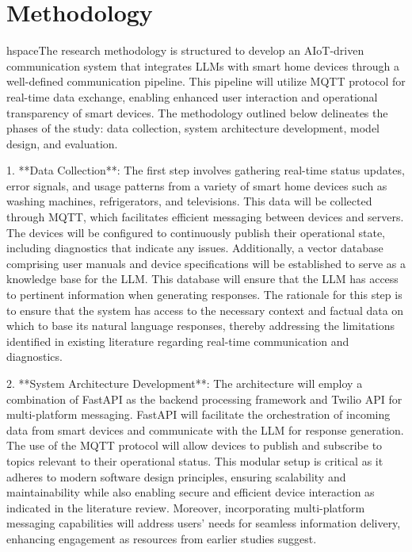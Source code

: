 \documentclass[conference]{IEEEtran}
\begin{document}
\section{Methodology}
hspace{}The research methodology is structured to develop an AIoT-driven communication system that integrates LLMs with smart home devices through a well-defined communication pipeline. This pipeline will utilize MQTT protocol for real-time data exchange, enabling enhanced user interaction and operational transparency of smart devices. The methodology outlined below delineates the phases of the study: data collection, system architecture development, model design, and evaluation.

1. **Data Collection**: 
   The first step involves gathering real-time status updates, error signals, and usage patterns from a variety of smart home devices such as washing machines, refrigerators, and televisions. This data will be collected through MQTT, which facilitates efficient messaging between devices and servers. The devices will be configured to continuously publish their operational state, including diagnostics that indicate any issues. Additionally, a vector database comprising user manuals and device specifications will be established to serve as a knowledge base for the LLM. This database will ensure that the LLM has access to pertinent information when generating responses. The rationale for this step is to ensure that the system has access to the necessary context and factual data on which to base its natural language responses, thereby addressing the limitations identified in existing literature regarding real-time communication and diagnostics.

2. **System Architecture Development**: 
   The architecture will employ a combination of FastAPI as the backend processing framework and Twilio API for multi-platform messaging. FastAPI will facilitate the orchestration of incoming data from smart devices and communicate with the LLM for response generation. The use of the MQTT protocol will allow devices to publish and subscribe to topics relevant to their operational status. This modular setup is critical as it adheres to modern software design principles, ensuring scalability and maintainability while also enabling secure and efficient device interaction as indicated in the literature review. Moreover, incorporating multi-platform messaging capabilities will address users’ needs for seamless information delivery, enhancing engagement as resources from earlier studies suggest.
\end{document}
